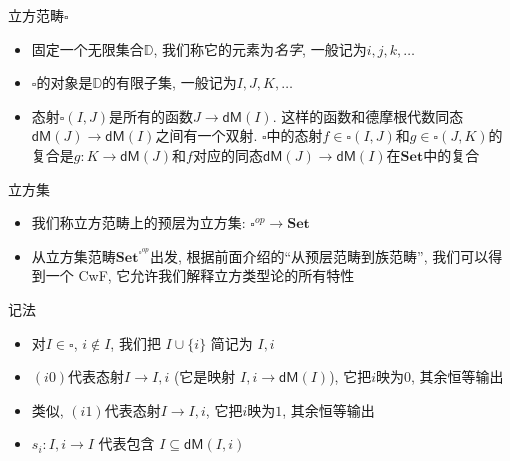 \documentclass[aspectratio=169,xcolor=dvipsnames]{beamer}
\newcommand\bbD{\mathbb{D}}
\newcommand\dM{\mathsf{dM}}
\newcommand\Set{\mathbf{Set}}
\begin{document}
\begin{frame}{立方范畴$\square$}
  \begin{itemize}
    \item 固定一个无限集合$\bbD$, 我们称它的元素为\emph{名字}, 一般记为$i,j,k,\ldots$
    \item $\square$的对象是$\bbD$的有限子集, 一般记为$I,J,K,\ldots$
    \item 态射$\square(I,J)$是所有的函数$J\to\dM(I)$. 这样的函数和德摩根代数同态$\dM(J)\to\dM(I)$之间有一个双射. $\square$中的态射$f\in\square(I,J)$和$g\in\square(J,K)$的复合是$g:K\to\dM(J)$和$f$对应的同态$\dM(J)\to\dM(I)$在$\Set$中的复合
  \end{itemize}
\end{frame}

\begin{frame}{立方集}
  \begin{itemize}
    \item 我们称立方范畴上的预层为立方集: $\square^{op} \to \Set$
    \item 从立方集范畴$\Set^{\square^{op}}$出发, 根据前面介绍的“从预层范畴到族范畴”, 我们可以得到一个 CwF, 它允许我们解释立方类型论的所有特性
  \end{itemize}
\end{frame}

\begin{frame}{记法}
  \begin{itemize}
    \item 对$I\in\square$, $i\notin I$, 我们把 $I\cup \{i\}$ 简记为 $I,i$
    \item $(i0)$代表态射$I\to I,i$ (它是映射 $I,i\to\dM(I)$), 它把$i$映为$0$, 其余恒等输出
    \item 类似, $(i1)$代表态射$I\to I,i$, 它把$i$映为$1$, 其余恒等输出
    \item $s_i:I,i\to I$ 代表包含 $I\subseteq\dM(I,i)$
  \end{itemize}
\end{frame}
\end{document}
